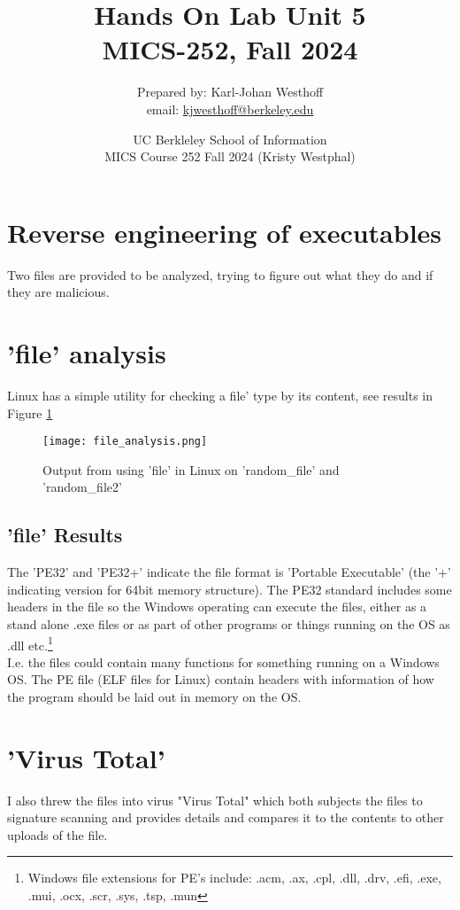 \documentclass[
	letterpaper, %
	10pt, %
	unnumberedsections, %
	twoside, %
]{APAAssignment}
\title{Hands On Lab Unit 5 \\ MICS-252, Fall 2024} %
\date{UC Berkleley School of Information \\
MICS Course 252 Fall 2024 (Kristy Westphal)
}
\author{
	Prepared by: Karl-Johan Westhoff \\
	email: \href{mailto:kjwesthoff@berkeley.edu}{kjwesthoff@berkeley.edu}
}
\begin{document}
\onecolumn
\maketitle %



\section{Reverse engineering of executables}\label{log-analysis}
Two files are provided to be analyzed, trying to figure out what they do and if they are malicious.

\section{'file' analysis}
Linux has a simple utility for checking a file' type by its content, see results in Figure \ref{fig:fileAnalysis}
\begin{figure}[!htp] %
	\centering
	\texttt{[image: file\_analysis.png]}
	\caption{Output from using 'file' in Linux on 'random\_file' and 'random\_file2'}
	\label{fig:fileAnalysis}
\end{figure}

\subsection{'file' Results} The 'PE32' and 'PE32+' indicate the file format is 'Portable Executable' (the '+' indicating version for 64bit memory structure)\cite{PE32Wikipedia}. The PE32 standard includes some headers in the file so the Windows operating can execute the files, either as a stand alone .exe files or as part of other programs or things running on the OS as .dll etc.\footnote{Windows file extensions for PE's include: .acm, .ax, .cpl, .dll, .drv, .efi, .exe, .mui, .ocx, .scr, .sys, .tsp, .mun\cite{PE32Wikipedia}} \\
I.e. the files could contain many functions for something running on a Windows OS. The PE file (ELF files for Linux) contain headers with information of how the program should be laid out in memory on the OS.

\section{'Virus Total'}\label{sec:ViruTotal}
I also threw the files into virus "Virus Total"\cite{VirusTotal} which both subjects the files to signature scanning and provides details and compares it to the contents to other uploads of the file.
\end{document}
